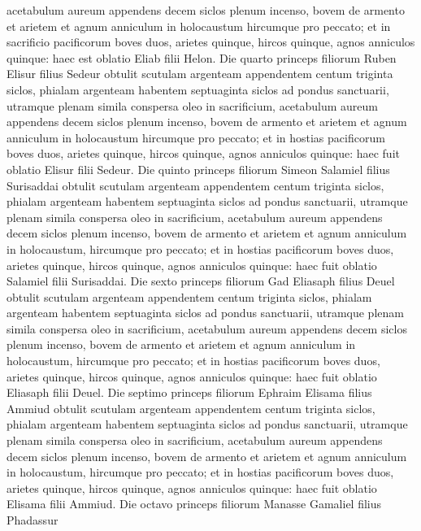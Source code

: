 \begin{biblechapter}
\verse acetabulum aureum appendens decem siclos plenum incenso, 
\verse bovem de armento et arietem et agnum anniculum in holocaustum 
\verse hircumque pro peccato; 
\verse et in sacrificio pacificorum boves duos, arietes quinque, hircos quinque, agnos anniculos quinque: haec est oblatio Eliab filii Helon. 
\verse Die quarto princeps filiorum Ruben Elisur filius Sedeur 
\verse obtulit scutulam argenteam appendentem centum triginta siclos, phialam argenteam habentem septuaginta siclos ad pondus sanctuarii, utramque plenam simila conspersa oleo in sacrificium, 
\verse acetabulum aureum appendens decem siclos plenum incenso, 
\verse bovem de armento et arietem et agnum anniculum in holocaustum 
\verse hircumque pro peccato; 
\verse et in hostias pacificorum boves duos, arietes quinque, hircos quinque, agnos anniculos quinque: haec fuit oblatio Elisur filii Sedeur. 
\verse Die quinto princeps filiorum Simeon Salamiel filius Surisaddai 
\verse obtulit scutulam argenteam appendentem centum triginta siclos, phialam argenteam habentem septuaginta siclos ad pondus sanctuarii, utramque plenam simila conspersa oleo in sacrificium, 
\verse acetabulum aureum appendens decem siclos plenum incenso, 
\verse bovem de armento et arietem et agnum anniculum in holocaustum, 
\verse hircumque pro peccato; 
\verse et in hostias pacificorum boves duos, arietes quinque, hircos quinque, agnos anniculos quinque: haec fuit oblatio Salamiel filii Surisaddai. 
\verse Die sexto princeps filiorum Gad Eliasaph filius Deuel 
\verse obtulit scutulam argenteam appendentem centum triginta siclos, phialam argenteam habentem septuaginta siclos ad pondus sanctuarii, utramque plenam simila conspersa oleo in sacrificium, 
\verse acetabulum aureum appendens decem siclos plenum incenso,  
\verse bovem de armento et arietem et agnum anniculum in holocaustum, 
\verse hircumque pro peccato; 
\verse et in hostias pacificorum boves duos, arietes quinque, hircos quinque, agnos anniculos quinque: haec fuit oblatio Eliasaph filii Deuel. 
\verse Die septimo princeps filiorum Ephraim Elisama filius Ammiud 
\verse obtulit scutulam argenteam appendentem centum triginta siclos, phialam argenteam habentem septuaginta siclos ad pondus sanctuarii, utramque plenam simila conspersa oleo in sacrificium, 
\verse acetabulum aureum appendens decem siclos plenum incenso, 
\verse bovem de armento et arietem et agnum anniculum in holocaustum, 
\verse hircumque pro peccato; 
\verse et in hostias pacificorum boves duos, arietes quinque, hircos quinque, agnos anniculos quinque: haec fuit oblatio Elisama filii Ammiud. 
\verse Die octavo princeps filiorum Manasse Gamaliel filius Phadassur 

\end{biblechapter}
